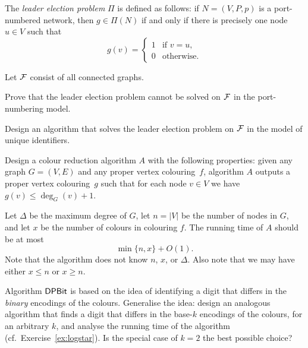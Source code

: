 \begin{ex}
    The \emph{leader election problem} $\Pi$ is defined as follows: if $N = (V,P,p)$ is a port-numbered network, then $g \in \Pi(N)$ if and only if there is precisely one node $u \in V$ such that
    \[
        g(v) = \begin{cases}
            1 & \text{if $v = u$}, \\
            0 & \text{otherwise}.
        \end{cases}
    \]
    
    Let $\mathcal{F}$ consist of all connected graphs.
    \begin{subex}
        \item Prove that the leader election problem cannot be solved on $\mathcal{F}$ in the port-numbering model.
        \item Design an algorithm that solves the leader election problem on $\mathcal{F}$ in the model of unique identifiers.
    \end{subex}
\end{ex}

\begin{ex}\label{ex:greedy-iterate}
    Design a colour reduction algorithm $A$ with the following properties:
    given any graph $G = (V,E)$ and any proper vertex colouring~$f$,
    algorithm $A$ outputs a proper vertex colouring~$g$ such that
    for each node $v \in V$ we have $g(v) \le \deg_G(v) + 1$.
    
    Let $\Delta$ be the maximum degree of $G$, let $n = |V|$ be the number of nodes in $G$, and let $x$ be the number of colours in colouring $f$. The running time of $A$ should be at most
    \[
        \min \{ n, x \} + O(1).
    \]
    Note that the algorithm does not know $n$, $x$, or $\Delta$. Also note that we may have either $x \le n$ or $x \ge n$.
    
\end{ex}

\begin{ex}\label{ex:dpbit-base}
    Algorithm $\textsf{DPBit}$ is based on the idea of identifying a digit that differs in the \emph{binary} encodings of the colours. Generalise the idea: design an analogous algorithm that finds a digit that differs in the base-$k$ encodings of the colours, for an arbitrary $k$, and analyse the running time of the algorithm (cf.\ Exercise~\ref{ex:logstar}). Is the special case of $k = 2$ the best possible choice?
\end{ex}

